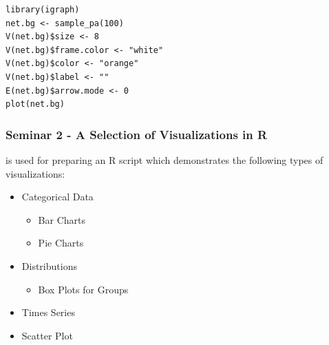 \documentclass{beamer}
\begin{document}
\begin{frame}[fragile] 
\begin{example} 
\begin{verbatim}
library(igraph)
net.bg <- sample_pa(100) 
V(net.bg)$size <- 8
V(net.bg)$frame.color <- "white"
V(net.bg)$color <- "orange"
V(net.bg)$label <- "" 
E(net.bg)$arrow.mode <- 0
plot(net.bg)
\end{verbatim}
\end{example}
\end{frame}

\begin{frame}
\frametitle{Seminar 2 - A Selection of Visualizations in R}

\cite{Kabacoff2020} is used for preparing an R script which demonstrates the following types of visualizations:\newline
\begin{itemize}
\item Categorical Data
\begin{itemize}
\item Bar Charts
\item Pie Charts

\end{itemize}

\item Distributions
\begin{itemize}
\item Box Plots for Groups
\end{itemize}

\item Times Series

\item Scatter Plot
\end{itemize}
\end{frame}
\end{document}
